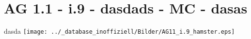 \section{AG 1.1 - i.9 - dasdads - MC - dasas}

\begin{beispiel}[AG 1.1]{1}
dasda
\texttt{[image: ../\_database\_inoffiziell/Bilder/AG11\_i.9\_hamster.eps]}
\end{beispiel}
